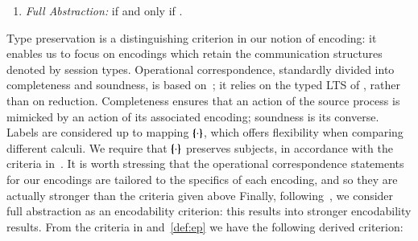 \begin{definition}
\begin{enumerate}[1.]
\begin{enumerate}
		\end{enumerate}
		
		\item \emph{Full Abstraction:} 
		if and only if
		.
		
	\end{enumerate}
\end{definition}

\smallskip 

\noi Type preservation is a distinguishing criterion in our notion of encoding: it enables us to focus on encodings which retain the communication structures denoted by session types.
Operational correspondence, standardly divided into completeness and soundness, is based
on~\cite{DBLP:journals/iandc/Gorla10,DBLP:conf/icalp/LanesePSS10};
it relies on 
the typed LTS of , 
rather than on reduction.
Completeness ensures that an action of the source process is mimicked
by an action of its associated encoding; soundness is its converse.
Labels are considered up to  mapping $\{\!\!\{\cdot\}\!\!\}$, which offers flexibility when comparing different calculi. We require that $\{\!\!\{\cdot\}\!\!\}$ preserves  subjects, in accordance with the criteria in~\cite{DBLP:conf/icalp/LanesePSS10}.
It is worth stressing that 
the operational correspondence statements 
for our encodings 
 are tailored to the specifics of each encoding, and so they
 are actually stronger than the criteria given above
Finally, following~\cite{SangiorgiD:expmpa,DBLP:conf/lics/PalamidessiSVV06,Yoshida96},
we consider full abstraction as an encodability criterion: this results into 
stronger encodability results. 
From the criteria in  and~\ref{def:ep}
we have the following derived criterion: 

\smallskip 


